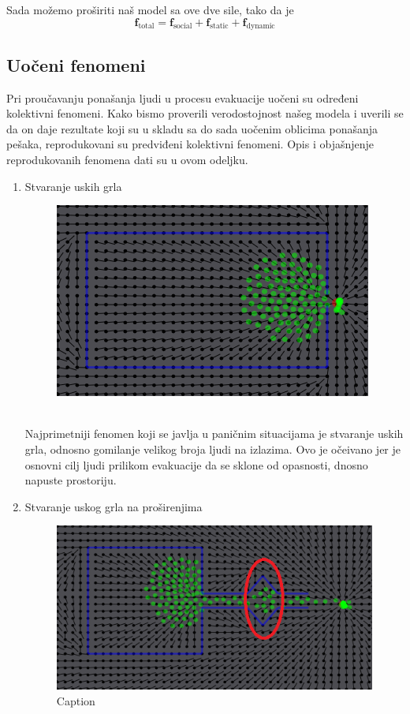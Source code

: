\documentclass[12pt]{article}
\begin{document}
	Sada možemo proširiti naš model sa ove dve sile, tako da je
	$$
		\mathbf f_\text{total} = \mathbf f_\text{social} + \mathbf f_\text{static} + \mathbf f_\text{dynamic}
	$$
	
	     
    \subsection{Uočeni fenomeni}
    Pri proučavanju ponašanja ljudi u procesu evakuacije uočeni su određeni kolektivni fenomeni. Kako bismo proverili verodostojnost našeg modela i uverili se da on daje rezultate koji su u skladu sa do sada uočenim oblicima ponašanja pešaka, reprodukovani su predviđeni kolektivni fenomeni. Opis i objašnjenje reprodukovanih fenomena dati su u ovom odeljku.
\begin{enumerate}
\item Stvaranje uskih grla

\begin{figure}
\centering
\includegraphics{UG} %
\
\end{figure}

Najprimetniji fenomen koji se javlja u paničnim situacijama je stvaranje uskih grla, odnosno gomilanje velikog broja ljudi na izlazima. Ovo je očeivano jer je osnovni cilj ljudi prilikom evakuacije da se sklone od opasnosti, dnosno napuste prostoriju.

\item Stvaranje uskog grla na proširenjima

\begin{figure}
\centering
\includegraphics{Guzva}
\caption{Caption}
\label{fig:my_label}
\end{figure}


\end{enumerate}
\end{document}
